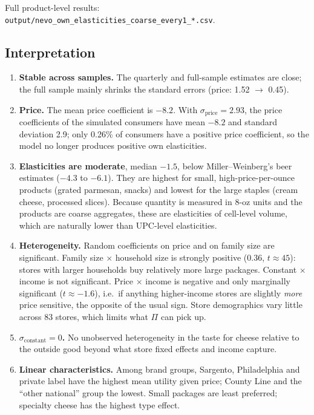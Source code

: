 \documentclass[11pt]{article}
\newcommand{\code}[1]{\texttt{#1}}
\newcommand{\sigconst}{\sigma_{\text{constant}}}
\newcommand{\sigprice}{\sigma_{\text{price}}}
\begin{document}
Full product-level results: \code{output/nevo\_own\_elasticities\_coarse\_every1\_*.csv}.

\subsection{Interpretation}\label{sec:interp}

\begin{enumerate}
  \item \textbf{Stable across samples.} The quarterly and full-sample estimates are close; the
        full sample mainly shrinks the standard errors (price: 1.52 $\to$ 0.45).
  \item \textbf{Price.} The mean price coefficient is $-8.2$. With $\sigprice = 2.93$, the
        price coefficients of the simulated consumers have mean $-8.2$ and standard deviation
        2.9; only 0.26\% of consumers have a positive price coefficient, so the model no
        longer produces positive own elasticities.
  \item \textbf{Elasticities are moderate}, median $-1.5$, below Miller--Weinberg's beer
        estimates ($-4.3$ to $-6.1$). They are highest for small, high-price-per-ounce
        products (grated parmesan, snacks) and lowest for the large staples (cream cheese,
        processed slices). Because quantity is measured in 8-oz units and the products are
        coarse aggregates, these are elasticities of cell-level volume, which are naturally
        lower than UPC-level elasticities.
  \item \textbf{Heterogeneity.} Random coefficients on price and on family size are
        significant. Family size $\times$ household size is strongly positive (0.36,
        $t \approx 45$): stores with larger households buy relatively more large packages.
        Constant $\times$ income is not significant. Price $\times$ income is negative and only
        marginally significant ($t \approx -1.6$), i.e.\ if anything higher-income stores are
        slightly \emph{more} price sensitive, the opposite of the usual sign. Store
        demographics vary little across 83 stores, which limits what $\Pi$ can pick up.
  \item \textbf{$\sigconst = 0$.} No unobserved heterogeneity in the taste for cheese relative
        to the outside good beyond what store fixed effects and income capture.
  \item \textbf{Linear characteristics.} Among brand groups, Sargento, Philadelphia and private
        label have the highest mean utility given price; County Line and the ``other
        national'' group the lowest. Small packages are least preferred; specialty cheese has
        the highest type effect.
\end{enumerate}
\end{document}
